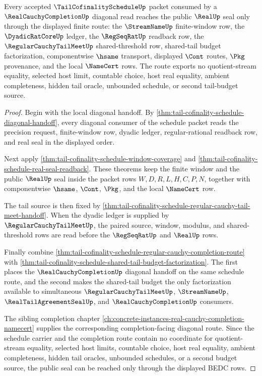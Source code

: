 \begin{theorem}
\label{thm:tail-cofinality-schedule-real-completion-diagonal-route}
Every accepted $\TailCofinalityScheduleUp$ packet consumed by a $\RealCauchyCompletionUp$ diagonal read reaches the public $\RealUp$ seal only through the displayed finite route: the $\StreamNameUp$ finite-window row, the $\DyadicRatCoreUp$ ledger, the $\RegSeqRatUp$ readback row, the $\RegularCauchyTailMeetUp$ shared-threshold row, shared-tail budget factorization, componentwise $\hsame$ transport, displayed $\Cont$ routes, $\Pkg$ provenance, and the local $\NameCert$ rows. The route exports no quotient-stream equality, selected host limit, countable choice, host real equality, ambient completeness, hidden tail oracle, unbounded schedule, or second tail-budget source.
\end{theorem}
\begin{proof}
Begin with the local diagonal handoff. By \autoref{thm:tail-cofinality-schedule-diagonal-handoff}, every diagonal consumer of the schedule packet reads the precision request, finite-window row, dyadic ledger, regular-rational readback row, and real seal in the displayed order.

Next apply \autoref{thm:tail-cofinality-schedule-window-coverage} and \autoref{thm:tail-cofinality-schedule-real-seal-readback}. These theorems keep the finite window and the public $\RealUp$ seal inside the packet rows $W,D,R,L,H,C,P,N$, together with componentwise $\hsame$, $\Cont$, $\Pkg$, and the local $\NameCert$ row.

The tail source is then fixed by \autoref{thm:tail-cofinality-schedule-regular-cauchy-tail-meet-handoff}. When the dyadic ledger is supplied by $\RegularCauchyTailMeetUp$, the paired source, window, modulus, and shared-threshold rows are read before the $\RegSeqRatUp$ and $\RealUp$ rows.

Finally combine \autoref{thm:tail-cofinality-schedule-regular-cauchy-completion-route} with \autoref{thm:tail-cofinality-schedule-shared-tail-budget-factorization}. The first places the $\RealCauchyCompletionUp$ diagonal handoff on the same schedule route, and the second makes the shared-tail budget the only factorization available to simultaneous $\RegularCauchyTailMeetUp$, $\StreamNameUp$, $\RealTailAgreementSealUp$, and $\RealCauchyCompletionUp$ consumers.

The sibling completion chapter \autoref{ch:concrete-instances-real-cauchy-completion-namecert} supplies the corresponding completion-facing diagonal route. Since the schedule carrier and the completion route contain no coordinate for quotient-stream equality, selected host limits, countable choice, host real equality, ambient completeness, hidden tail oracles, unbounded schedules, or a second budget source, the public seal can be reached only through the displayed BEDC rows.
\end{proof}

